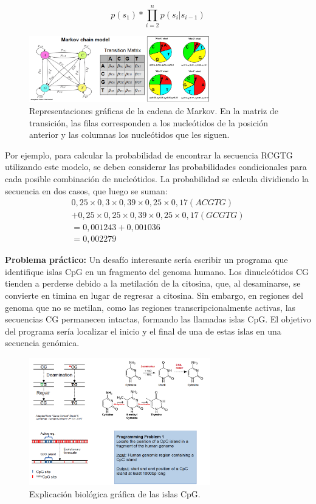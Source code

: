  $$ p(s_1) * \prod_{i=2}^{n} p(s_i | s_{i-1}) $$
 
\begin{figure}[htbp]
\centering
\includegraphics[width = 0.7\textwidth]{figs/markov.png}
\caption{Representaciones gráficas de la cadena de Markov. En la matriz de transición, las filas corresponden a los nucleótidos de la posición anterior y las columnas los nucleótidos que les siguen. }
\label{fig:markov}
\end{figure}
 
Por ejemplo, para calcular la probabilidad de encontrar la secuencia RCGTG utilizando este modelo, se deben considerar las probabilidades condicionales para cada posible combinación de nucleótidos. La probabilidad se calcula dividiendo la secuencia en dos casos, que luego se suman:
\begin{align*}
0,25 \times 0,3 \times 0,39 \times 0,25 \times 0,17 (ACGTG) \\
+ 0,25 \times 0,25 \times 0,39 \times 0,25 \times 0,17 (GCGTG) \\
= 0,001243 + 0,001036 \\
= 0,002279 
\end{align*}
 
\textbf{Problema práctico:}
Un desafío interesante sería escribir un programa que identifique islas CpG en un fragmento del genoma humano. Los dinucleótidos CG tienden a perderse debido a la metilación de la citosina, que, al desaminarse, se convierte en timina en lugar de regresar a citosina. Sin embargo, en regiones del genoma que no se metilan, como las regiones transcripcionalmente activas, las secuencias CG permanecen intactas, formando las llamadas islas CpG. El objetivo del programa sería localizar el inicio y el final de una de estas islas en una secuencia genómica.
\begin{figure}[htbp]
\centering
\includegraphics[width = 0.7\textwidth]{figs/cpg-islands.png}
\caption{Explicación biológica gráfica de las islas CpG. }
\end{figure}
 